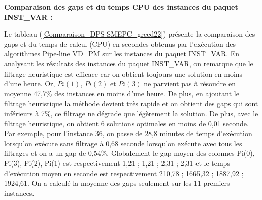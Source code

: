 \textbf{Comparaison des gaps et du temps CPU des instances du paquet INST\_VAR :}

Le tableau (\ref{Comparaison_DPS-SMEPC_greed22}) présente la comparaison des gaps et du temps de calcul (CPU) en secondes obtenus par l'exécution des algorithmes Pipe-line VD\_PM sur les instances du paquet INST\_VAR.
En analysant les résultats des instances du paquet INST\_VAR, on remarque que le filtrage heuristique est efficace car on obtient toujours une solution en moins d'une heure. Or, $Pi(1)$, $Pi(2)$ et $Pi(3)$ ne parvient pas à résoudre en moyenne 47,7\% des instances en moins d'une heure. De plus, en ajoutant le filtrage heuristique la méthode devient très rapide et on obtient des gaps qui sont inférieurs à 7\%, ce filtrage ne dégrade que légèrement la solution. De plus, avec le filtrage heuristique, on obtient 6 solutions optimales en moins de 0,01 seconde. Par exemple, pour l'instance 36, on passe de 28,8 minutes de temps d'exécution lorsqu'on exécute sans filtrage à 0,68 seconde lorsqu'on exécute avec tous les filtrages et on a un gap de 0,54\%.
Globalement le gap moyen des colonnes Pi(0), Pi(3), Pi(2), Pi(1) est respectivement 1,21 ; 1,21 ; 2,31 ; 2,31 et le temps d'exécution moyen en seconde est respectivement 210,78 ; 1665,32 ; 1887,92 ; 1924,61.  
On a calculé la moyenne des gaps seulement sur les 11 premiers instances. 
